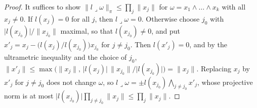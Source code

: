 \documentclass[11pt]{amsart}
\theoremstyle{definition}
\theoremstyle{remark}
\numberwithin{equation}{section}
\newcommand{\abs}[1]{\lvert #1\rvert}
\newcommand{\norm}[1]{\lVert #1\rVert}
\theoremstyle{plain}
\theoremstyle{definition}
\theoremstyle{plain}
\begin{document}
\begin{proof}
It suffices to show $\norm{l\mathbin{\lrcorner}\omega}_\pi\le\prod_j\norm{x_j}$ for $\omega=x_1\wedge\dots\wedge x_k$ with all $x_j\ne0$.
If $l(x_j)=0$ for all $j$, then $l\mathbin{\lrcorner}\omega=0$. Otherwise choose $j_0$ with $\abs{l(x_{j_0})}/\norm{x_{j_0}}$ maximal, so
that $l(x_{j_0})\ne0$, and put $x'_j=x_j-\bigl(l(x_j)/l(x_{j_0})\bigr)x_{j_0}$ for $j\ne j_0$. Then $l(x'_j)=0$, and by the
ultrametric inequality and the choice of $j_0$,
$\norm{x'_j}\le\max\bigl(\norm{x_j},\,\abs{l(x_j)}\,\norm{x_{j_0}}/\abs{l(x_{j_0})}\bigr)=\norm{x_j}$. Replacing $x_j$ by $x'_j$ for $j\ne j_0$
does not change $\omega$, so $l\mathbin{\lrcorner}\omega=\pm l(x_{j_0})\bigwedge_{j\ne j_0}x'_j$, whose projective norm is at most
$\abs{l(x_{j_0})}\prod_{j\ne j_0}\norm{x_j}\le\prod_j\norm{x_j}$.
\end{proof}
\end{document}
